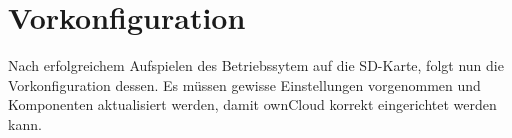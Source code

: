\section{Vorkonfiguration}
Nach erfolgreichem Aufspielen des Betriebssytem auf die SD-Karte, folgt nun die Vorkonfiguration dessen. Es müssen gewisse Einstellungen vorgenommen und Komponenten aktualisiert werden, damit ownCloud korrekt eingerichtet werden kann.


